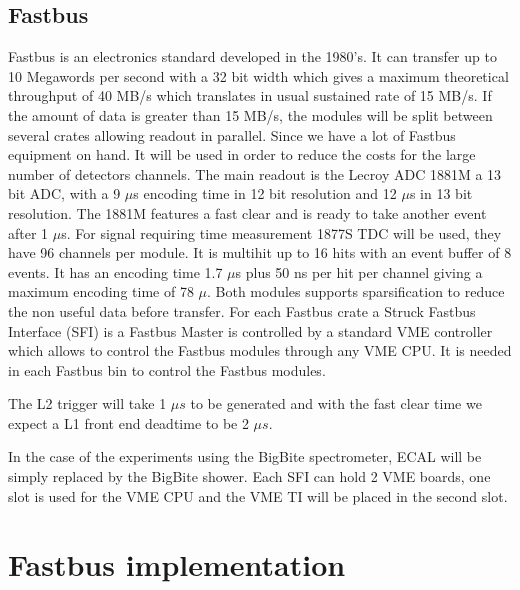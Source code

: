 \documentclass{article}
\begin{document}
\subsection{Fastbus}
Fastbus is an electronics standard developed in the 1980's. It can transfer up to 10 Megawords per second with a 32 bit width which gives a maximum theoretical throughput of 40 MB/s which translates in usual sustained rate of 15 MB/s. If the amount of data is greater than 15 MB/s, the modules will be split between several crates allowing readout in parallel.
Since we have a lot of Fastbus equipment on hand. It will be used in order to reduce the costs for the large number of detectors channels. The main readout is the Lecroy ADC 1881M a 13 bit ADC, with a 9 $\mu$s encoding time in 12 bit resolution and 12  $\mu$s in 13 bit resolution. The 1881M features a fast clear and is ready to take another event after 1 $\mu$s. For signal requiring time measurement 1877S TDC will be used, they have 96 channels per module. It is multihit up to 16 hits with an event buffer of 8 events. It has an encoding time  1.7 $\mu$s plus 50 ns per hit per channel giving a maximum encoding time of 78 $\mu$. Both modules supports sparsification to reduce the non useful data before transfer.
For each Fastbus crate a Struck Fastbus Interface (SFI) is a Fastbus Master is controlled by a standard VME controller which allows to control the Fastbus modules through any VME CPU. It is needed in each Fastbus bin to control the Fastbus modules.

The L2 trigger will take 1 $\mu s$ to be generated and with the fast clear time we expect a L1 front end deadtime to be 2 $\mu s$.

In the case of the experiments using the BigBite spectrometer, ECAL will be simply replaced by the BigBite shower.
Each SFI can hold 2 VME boards, one slot is used for the VME CPU and the VME TI will be placed in the second slot.

\section{Fastbus implementation}
\end{document}

